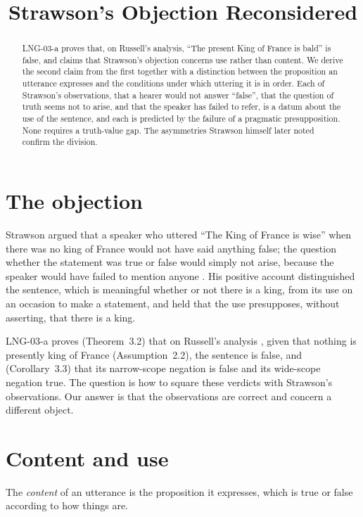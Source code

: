 \documentclass{situationist-preprint}
\title{Strawson's Objection Reconsidered}
\begin{document}
\maketitle

\begin{abstract}
LNG-03-a proves that, on Russell's analysis, \enquote{The present King of France is bald} is false, and claims that Strawson's objection concerns use rather than content. We derive the second claim from the first together with a distinction between the proposition an utterance expresses and the conditions under which uttering it is in order. Each of Strawson's observations, that a hearer would not answer \enquote{false}, that the question of truth seems not to arise, and that the speaker has failed to refer, is a datum about the use of the sentence, and each is predicted by the failure of a pragmatic presupposition. None requires a truth-value gap. The asymmetries Strawson himself later noted confirm the division.
\end{abstract}

\section{The objection}

Strawson argued that a speaker who uttered \enquote{The King of France is wise} when there was no king of France would not have said anything false; the question whether the statement was true or false would simply not arise, because the speaker would have failed to mention anyone \citep{Strawson1950}. His positive account distinguished the sentence, which is meaningful whether or not there is a king, from its use on an occasion to make a statement, and held that the use presupposes, without asserting, that there is a king.

LNG-03-a proves (Theorem~3.2) that on Russell's analysis \citep{Russell1905}, given that nothing is presently king of France (Assumption~2.2), the sentence is false, and (Corollary~3.3) that its narrow-scope negation is false and its wide-scope negation true. The question is how to square these verdicts with Strawson's observations. Our answer is that the observations are correct and concern a different object.

\section{Content and use}

\begin{definition}\label{d:content}
The \emph{content} of an utterance is the proposition it expresses, which is true or false according to how things are.
\end{definition}
\end{document}
